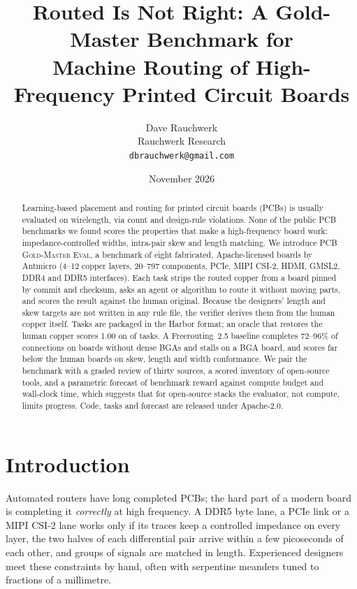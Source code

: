 \documentclass[11pt]{article}
\title{Routed Is Not Right: A Gold-Master Benchmark for\\ Machine Routing of High-Frequency Printed Circuit Boards}
\author{Dave Rauchwerk\\ Rauchwerk Research\\ \texttt{dbrauchwerk@gmail.com}}
\date{November 2026}
\begin{document}
\maketitle

\begin{abstract}
Learning-based placement and routing for printed circuit boards (PCBs) is usually evaluated on wirelength, via count and design-rule violations. None of the public PCB benchmarks we found scores the properties that make a high-frequency board work: impedance-controlled widths, intra-pair skew and length matching. We introduce \textsc{PCB Gold-Master Eval}, a benchmark of eight fabricated, Apache-licensed boards by Antmicro (4--12 copper layers, 20--797 components, PCIe, MIPI CSI-2, HDMI, GMSL2, DDR4 and DDR5 interfaces). Each task strips the routed copper from a board pinned by commit and checksum, asks an agent or algorithm to route it without moving parts, and scores the result against the human original. Because the designers' length and skew targets are not written in any rule file, the verifier derives them from the human copper itself. Tasks are packaged in the Harbor format; an oracle that restores the human copper scores 1.00 on \noracle{} of \noracleall{} tasks. A Freerouting~2.5 baseline completes 72--96\% of connections on boards without dense BGAs and stalls on a BGA board, and scores far below the human boards on skew, length and width conformance. We pair the benchmark with a graded review of thirty sources, a scored inventory of open-source tools, and a parametric forecast of benchmark reward against compute budget and wall-clock time, which suggests that for open-source stacks the evaluator, not compute, limits progress. Code, tasks and forecast are released under Apache-2.0.
\end{abstract}

\section{Introduction}
Automated routers have long completed PCBs; the hard part of a modern board is completing it \emph{correctly} at high frequency. A DDR5 byte lane, a PCIe link or a MIPI CSI-2 lane works only if its traces keep a controlled impedance on every layer, the two halves of each differential pair arrive within a few picoseconds of each other, and groups of signals are matched in length. Experienced designers meet these constraints by hand, often with serpentine meanders tuned to fractions of a millimetre.
\end{document}
